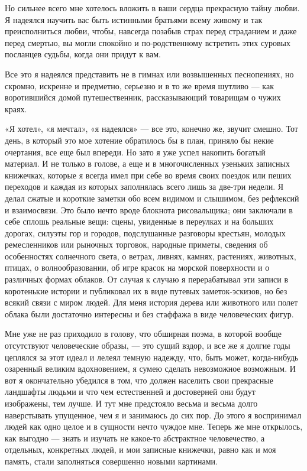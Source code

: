 Но сильнее всего  мне хотелось вложить в ваши  сердца прекрасную тайну
любви. Я  надеялся научить  вас быть  истинными братьями  всему живому
и  так  преисполниться  любви,  чтобы, навсегда  позабыв  страх  перед
страданием и даже  перед смертью, вы могли  спокойно и по-родственному
встретить этих суровых посланцев судьбы, когда они придут к вам.

Все  это   я  надеялся  представить   не  в  гимнах   или  возвышенных
песнопениях,  но   скромно,  искренне   и  предметно,  серьезно   и  в
то  же  время  шутливо  ---  как  воротившийся  домой  путешественник,
рассказывающий товарищам о чужих краях.

«Я хотел»,  «я мечтал», «я надеялся»  --- все это, конечно  же, звучит
смешно. Тот  день, в  который это  мое хотение  обратилось бы  в план,
приняло  бы некие  очертания,  все  еще был  впереди.  Но  зато я  уже
успел  накопить богатый  материал. И  не только  в голове,  а еще  и в
многочисленных узеньких записных книжечках,  которые я всегда имел при
себе во  время своих поездок или  пеших переходов и каждая  из которых
заполнялась всего  лишь за две-три  недели. Я делал сжатые  и короткие
заметки обо всем видимом и  слышимом, без рефлексий и взаимосвязи. Это
было нечто  вроде блокнота рисовальщика;  они заключали в  себе сплошь
реальные  вещи: сцены,  увиденные в  переулках и  на больших  дорогах,
силуэты  гор  и  городов,  подслушанные  разговоры  крестьян,  молодых
ремесленников  или рыночных  торговок, народные  приметы, сведения  об
особенностях солнечного  света, о  ветрах, ливнях,  камнях, растениях,
животных,  птицах,  о  волнообразовании,  об игре  красок  на  морской
поверхности  и  о различных  формах  облаков.  От  случая к  случаю  я
перерабатывал эти записи в коротенькие  истории и публиковал их в виде
путевых  заметок-эскизов,  но без  всякий  связи  с миром  людей.  Для
меня история  дерева или  животного или  полет облака  были достаточно
интересны и без стаффажа в виде человеческих фигур.

Мне  уже не  раз приходило  в голову,  что обширная  поэма, в  которой
вообще отсутствуют человеческие образы, ---  это сущий вздор, и все же
я долгие  годы цеплялся за  этот идеал  и лелеял темную  надежду, что,
быть  может,  когда-нибудь  озаренный великим  вдохновением,  я  сумею
сделать невозможное  возможным. И вот  я окончательно убедился  в том,
что  должен  населить  свои  прекрасные ландшафты  людьми  и  что  чем
естественней и достоверней они будут  изображены, тем лучше. И тут мне
предстояло  весьма и  весьма  долго наверстывать  упущенное,  чем я  и
занимаюсь до сих пор. До этого я  воспринимал людей как одно целое и в
сущности нечто  чуждое мне. Теперь  же мне открылось, как  выгодно ---
знать  и изучать  не какое-то  абстрактное человечество,  а отдельных,
конкретных людей,  и мои  записные книжечки, равно  как и  моя память,
стали заполняться совершенно новыми картинами.

